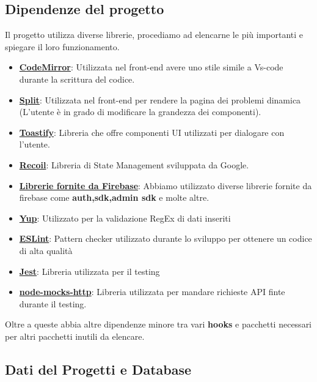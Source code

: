 \documentclass[11pt, a4paper]{article}
\theoremstyle{definition}
\begin{document}
\subsection{Dipendenze del progetto}
Il progetto utilizza diverse librerie, procediamo ad elencarne le più importanti e spiegare il loro funzionamento.
\begin{itemize}
  \item \href{https://codemirror.net/}{\textbf{CodeMirror}}: Utilizzata nel front-end avere uno stile simile a Vs-code durante la scrittura del codice.
  \item \href{https://split.js.org/}{\textbf{Split}}: Utilizzata nel front-end per rendere la pagina dei problemi dinamica (L'utente è in grado di modificare la grandezza dei componenti).
  \item \href{https://www.npmjs.com/package/react-toastify}{\textbf{Toastify}}: Libreria che offre componenti UI utilizzati per dialogare con l'utente.
  \item \href{https://recoiljs.org/}{\textbf{Recoil}}: Libreria di State Management sviluppata da Google.
  \item \href{https://firebase.google.com/docs/build}{\textbf{Librerie fornite da Firebase}}: Abbiamo utilizzato diverse librerie fornite da firebase come \textbf{auth,sdk,admin sdk} e molte altre.
  \item \href{https://www.npmjs.com/package/yup}{\textbf{Yup}}: Utilizzato per la validazione RegEx di dati inseriti
  \item \href{https://eslint.org/}{\textbf{ESLint}}: Pattern checker utilizzato durante lo sviluppo per ottenere un codice di alta qualità
  \item \href{https://jestjs.io/}{\textbf{Jest}}: Libreria utilizzata per il testing
  \item \href{https://www.npmjs.com/package/node-mocks-http}{\textbf{node-mocks-http}}: Libreria utilizzata per mandare richieste API finte durante il testing.
\end{itemize}
Oltre a queste abbia altre dipendenze minore tra vari \textbf{hooks} e pacchetti necessari per altri pacchetti inutili da elencare.
\subsection{Dati del Progetti e Database}
\end{document}

